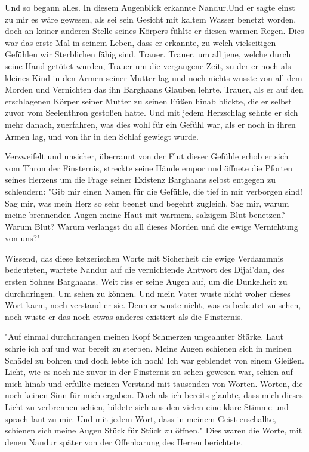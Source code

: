 \documentclass[14pt,twoside,BCOR=12mm,DIV=classic]{scrbook}
\begin{document}
Und so begann alles. In diesem Augenblick erkannte Nandur.Und er sagte einst zu
mir es wäre gewesen, als sei sein Gesicht mit kaltem Wasser benetzt worden, doch
an keiner anderen Stelle seines Körpers fühlte er diesen warmen Regen. Dies war
das erste Mal in seinem Leben, dass er erkannte, zu welch vielseitigen Gefühlen
wir Sterblichen fähig sind. Trauer. Trauer, um all jene, welche durch seine Hand
getötet wurden, Trauer um die vergangene Zeit, zu der er noch als kleines Kind
in den Armen seiner Mutter lag und noch nichts wusste von all dem Morden und
Vernichten das ihn Barghaans Glauben lehrte. Trauer, als er auf den erschlagenen
Körper seiner Mutter zu seinen Füßen hinab blickte, die er selbst zuvor vom
Seelenthron gestoßen hatte.
Und mit jedem Herzschlag sehnte er sich mehr danach, zuerfahren, was dies wohl
für ein Gefühl war, als er noch in ihren Armen lag, und von ihr in den Schlaf
gewiegt wurde.

Verzweifelt und unsicher, überrannt von der Flut dieser Gefühle erhob er sich
vom Thron der Finsternis, streckte seine Hände empor und öffnete die Pforten
seines Herzens um die Frage seiner Existenz Barghaans selbst entgegen zu
schleudern: "Gib mir einen Namen für die Gefühle, die tief in mir verborgen
sind! Sag mir, was mein Herz so sehr beengt und begehrt zugleich. Sag mir, warum
meine brennenden Augen meine Haut mit warmem, salzigem Blut benetzen? Warum
Blut? Warum verlangst du all dieses Morden und die ewige Vernichtung von uns?"

Wissend, das diese ketzerischen Worte mit Sicherheit die ewige Verdammnis
bedeuteten, wartete Nandur auf die vernichtende Antwort des Dijai'dan, des
ersten Sohnes Barghaans. Weit riss er seine Augen auf, um die Dunkelheit zu
durchdringen. Um sehen zu können. Und mein Vater wuste nicht woher dieses Wort
karm, noch verstand er sie. Denn er wuste nicht, was es bedeutet zu sehen, noch
wuste er das noch etwas anderes existiert als die Finsternis.

"Auf einmal durchdrangen meinen Kopf Schmerzen ungeahnter Stärke. Laut schrie
ich auf und war bereit zu sterben. Meine Augen schienen sich in meinen Schädel
zu bohren und doch lebte ich noch! Ich war geblendet von einem Gleißen. Licht,
wie es noch nie zuvor in der Finsternis zu sehen gewesen war, schien auf mich
hinab und erfüllte meinen Verstand mit tausenden von Worten. Worten, die noch
keinen Sinn für mich ergaben. Doch als ich bereits glaubte, dass mich dieses
Licht zu verbrennen schien, bildete sich aus den vielen eine klare Stimme und
sprach laut zu mir. Und mit jedem Wort, dass in meinem Geist erschallte,
schienen sich meine Augen Stück für Stück zu öffnen." Dies waren die Worte, mit
denen Nandur später von der Offenbarung des Herren berichtete.
\end{document}
